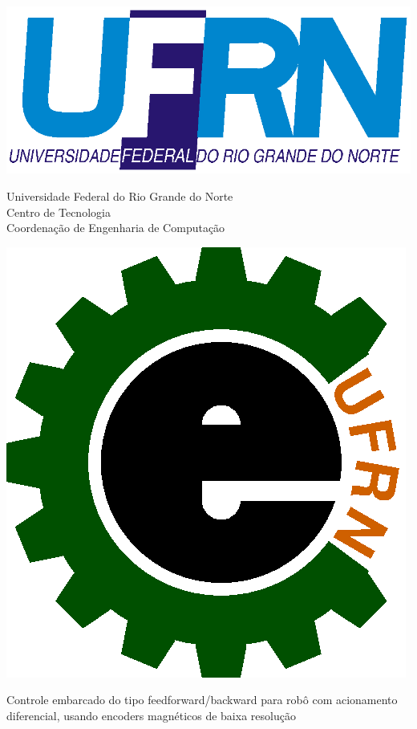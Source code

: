 \documentclass[a4paper, 12pt]{article}
\begin{document}
\thispagestyle{empty}

\begin{minipage}{0.15\linewidth}
\begin{flushleft}
\includegraphics[width=\linewidth]{UFRN}
\end{flushleft}
\end{minipage}\hfill
\begin{minipage}{0.65\linewidth}
\centering Universidade Federal do Rio Grande do Norte\\
Centro de Tecnologia\\
Coordenação de Engenharia de Computação
\end{minipage}\hfill
\begin{minipage}{0.15\linewidth}
\begin{flushright}
\includegraphics[width=0.6\linewidth]{EngComp}
\end{flushright}
\end{minipage}


\vfill

\begin{center}

\Large{Controle embarcado do tipo feedforward/backward para robô com 
acionamento diferencial, usando encoders magnéticos de baixa resolução}
\end{center}
\end{document}
